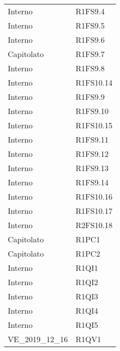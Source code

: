 {\begin{longtable}{ C{4cm} C{4cm}}
Interno & R1FS9.4\\

Interno & R1FS9.5\\

Interno & R1FS9.6\\

Capitolato & R1FS9.7\\

Interno & R1FS9.8\\


Interno & R1FS10.14\\

Interno & R1FS9.9\\

Interno & R1FS9.10\\

Interno & R1FS10.15\\

Interno & R1FS9.11\\

Interno & R1FS9.12\\

Interno & R1FS9.13\\

Interno & R1FS9.14\\

Interno & R1FS10.16\\

Interno & R1FS10.17\\

Interno & R2FS10.18\\


Capitolato & R1PC1\\

Capitolato & R1PC2\\


Interno & R1QI1\\

Interno & R1QI2\\

Interno & R1QI3\\

Interno & R1QI4\\

Interno & R1QI5\\

VE\_2019\_12\_16 & R1QV1\\


\end{longtable}}
